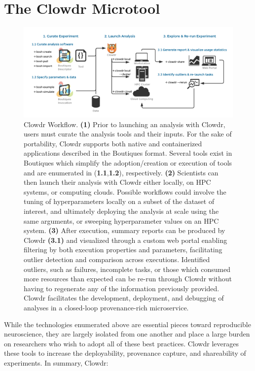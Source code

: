 \documentclass[fleqn,12pt]{SelfArx_ch} %
\begin{document}
\section{The Clowdr Microtool}

\begin{figure}[h!]
\centering
\includegraphics[width=\textwidth]{./figures/fig1.pdf}
\caption{Clowdr Workflow. \textbf{(1)} Prior to launching an analysis with Clowdr, users must curate the
analysis tools and their inputs. For the sake of portability, Clowdr supports both native and containerized
applications described in the Boutiques format. Several tools exist in Boutiques which simplify the adoption/creation
or execution of tools and are enumerated in (\textbf{1.1},\textbf{1.2}), respectively. \textbf{(2)} Scientists can then
launch their analysis with Clowdr either locally, on HPC systems, or computing clouds. Possible workflows could involve
the tuning of hyperparameters locally on a subset of the dataset of interest, and ultimately deploying the analysis at
scale using the same arguments, or sweeping hyperparameter values on an HPC system. \textbf{(3)} After execution,
summary reports can be produced by Clowdr \textbf{(3.1)} and visualized through a custom web portal enabling filtering
by both execution properties and parameters, facilitating outlier detection and comparison across executions.
Identified outliers, such as failures, incomplete tasks, or those which consumed more resources than expected can be
re-run through Clowdr without having to regenerate any of the information previously provided. Clowdr facilitates the
development, deployment, and debugging of analyses in a closed-loop provenance-rich microservice.}
\label{fig:ch1.1}
\end{figure}
While the technologies enumerated above are essential pieces toward reproducible neuroscience, they are largely
isolated from one another and place a large burden on researchers who wish to adopt all of these best practices. Clowdr
leverages these tools to increase the deployability, provenance capture, and shareability of experiments. In summary,
Clowdr:
\end{document}
